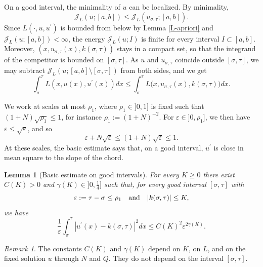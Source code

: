 \documentclass[reqno,12pt]{amsart}
\numberwithin{equation}{section}
\def\eps{\varepsilon}
\def\J{\mathcal{J}_L}
\newtheorem{lemma}[theorem]{Lemma}
\theoremstyle{remark}
\newtheorem{remark}[theorem]{Remark}
\begin{document}
\medskip

On a good interval, the minimality of $u$ can be localized. By minimality,
\begin{equation*}
\J(u;[a,b])\leq\J(u_{\sigma,\tau};[a,b]).
\end{equation*} Since $L(\cdot,u,u^\prime)$ is bounded from below by Lemma \ref{L-apriori} and $\J(u;[a,b])<\infty$, the energy $\J(u;I)$ is finite for every interval $I\subset[a,b]$. Moreover, $(x,u_{\sigma,\tau}(x),k(\sigma,\tau))$ stays in a compact set, so that the integrand of the competitor is bounded on $[\sigma,\tau]$. As $u$ and $u_{\sigma,\tau}$ coincide outside $[\sigma,\tau]$, we may subtract $\J(u;[a,b]\setminus[\sigma,\tau])$ from both sides, and we get
\begin{equation}\label{good}
\int_\sigma^\tau L(x,u(x),u^\prime(x))dx\leq\int_\sigma^\tau L\big(x,u_{\sigma,\tau}(x),k(\sigma,\tau)\big)dx.
\end{equation}

\medskip

We work at scales at most $\rho_1$, where $\rho_1\in]0,1]$ is fixed such that $(1+N)\sqrt{\rho_1}\leq1$, for instance $\rho_1:=(1+N)^{-2}$. For $\eps\in]0,\rho_1]$, we then have $\eps\leq\sqrt\eps$, and so
\begin{equation}\label{rho1}
\eps+N\sqrt\eps\leq(1+N)\sqrt\eps\leq1.
\end{equation}
At these scales, the basic estimate says that, on a good interval, $u^\prime$ is close in mean square to the slope of the chord.

\begin{lemma}[Basic estimate on good intervals]\label{L-good}
For every $K\geq0$ there exist $C(K)>0$ and $\gamma(K)\in]0,\frac14]$ such that, for every good interval $[\sigma,\tau]$ with
\begin{equation*}
\eps:=\tau-\sigma\leq\rho_1\quad\hbox{and}\quad|k(\sigma,\tau)|\leq K,
\end{equation*}
we have
\begin{equation}\label{L2}
\frac1\eps\int_\sigma^\tau|u^\prime(x)-k(\sigma,\tau)|^2dx\leq C(K)^2\eps^{2\gamma(K)}.
\end{equation}
\end{lemma}

\begin{remark}
The constants $C(K)$ and $\gamma(K)$ depend on $K$, on $L$, and on the fixed solution $u$ through $N$ and $Q$. They do not depend on the interval $[\sigma,\tau]$.
\end{remark}
\end{document}
